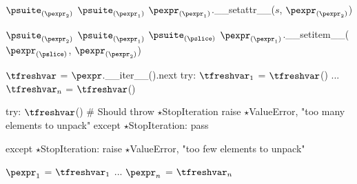 \documentclass{article}
\begin{document}
\begin{mathpar}
\end{mathpar}

\newsavebox{\attributeAssignmentBox}
\begin{lrbox}{\attributeAssignmentBox}
\begin{python}
$\psuite_{(\pexpr_2)}$
$\psuite_{(\pexpr_1)}$
$\pexpr_{(\pexpr_1)}$.__setattr__($s$, $\pexpr_{(\pexpr_2)}$)
\end{python}
\end{lrbox}

\begin{mathpar}
\end{mathpar}

\newsavebox{\sliceAssignmentBox}
\begin{lrbox}{\sliceAssignmentBox}
\begin{python}
$\psuite_{(\pexpr_2)}$
$\psuite_{(\pexpr_1)}$
$\psuite_{(\pslice)}$
$\pexpr_{(\pexpr_1)}$.__setitem__($\pexpr_{(\pslice)}$, $\pexpr_{(\pexpr_2)}$)
\end{python}
\end{lrbox}

\begin{mathpar}
\end{mathpar}

\begin{mathpar}
\end{mathpar}

\newsavebox{\tupleAssignmentBox}
\begin{lrbox}{\tupleAssignmentBox}
\begin{python}
$\tfreshvar$ = $\pexpr$.__iter__().next
try:
  $\tfreshvar_1$ = $\tfreshvar$()
  ...
  $\tfreshvar_n$ = $\tfreshvar$()

  try:
    $\tfreshvar$() # Should throw $\star$StopIteration
    raise $\star$ValueError, "too many elements to unpack"
  except $\star$StopIteration:
    pass

except $\star$StopIteration:
  raise $\star$ValueError, "too few elements to unpack"

$\pexpr_1$ = $\tfreshvar_1$
...
$\pexpr_n$ = $\tfreshvar_n$
\end{python}
\end{lrbox}
\end{document}
